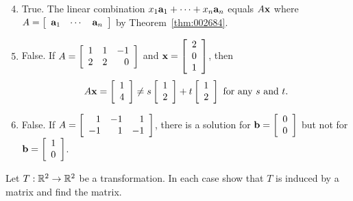 \begin{multicols}{2}
\begin{ex}
\begin{sol}
\begin{enumerate}[label={\alph*.}]
\setcounter{enumi}{3}
\item True. The linear combination $x_{1}\textbf{a}_{1} + \cdots  + x_{n}\textbf{a}_{n}$ equals $A\textbf{x}$ where $A = \left[ \begin{array}{ccc}
\textbf{a}_{1} & \cdots & \textbf{a}_{n}
\end{array} \right]$ by Theorem~\ref{thm:002684}.

\setcounter{enumi}{5}
\item False. If $A = \left[ \begin{array}{rrr}
1 & 1 & -1 \\
2 & 2 & 0
\end{array} \right]$
 and $\textbf{x} = \left[ \begin{array}{r}
 2 \\
 0 \\
 1
 \end{array} \right]$, then
\begin{equation*}
A\textbf{x} = \left[ \begin{array}{r}
1 \\
4
\end{array} \right] \neq s \left[ \begin{array}{r}
1 \\
2
\end{array} \right] + t \left[ \begin{array}{r}
1 \\
2
\end{array} \right] \mbox{ for any } s \mbox{ and } t.
\end{equation*}
\setcounter{enumi}{7}
\item False. If 
$
A = \left[ \begin{array}{rrr}
1 & -1 & 1 \\
-1 & 1 & -1
\end{array} \right]$, there is a solution for $\textbf{b} = \left[ \begin{array}{r}
0 \\
0
\end{array} \right]$ but not for $\textbf{b} = \left[ \begin{array}{r}
1 \\
0
\end{array} \right]$.

\end{enumerate}
\end{sol}
\end{ex}

\begin{ex}
Let $T : \mathbb{R}^2 \to \mathbb{R}^2$ be a transformation. In each case show that $T$ is induced by a matrix and find the matrix.



\end{ex}
\end{multicols}
